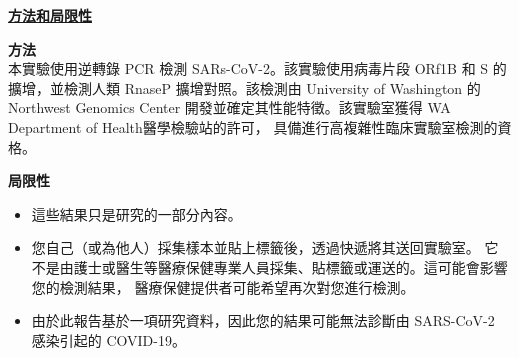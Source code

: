 \documentclass[10pt]{article}
\begin{document}
\bigskip

\large \underline{\textbf{方法和局限性}}

\textbf{方法}\\
本實驗使用逆轉錄 PCR 檢測 SARs-CoV-2。該實驗使用病毒片段 ORf1B 和 S 的擴增，並檢測人類
RnaseP 擴增對照。該檢測由 University of Washington 的 Northwest Genomics Center
開發並確定其性能特徵。該實驗室獲得 WA Department of Health醫學檢驗站的許可，
具備進行高複雜性臨床實驗室檢測的資格。

\textbf{局限性}

\begin{itemize}

\item

  這些結果只是研究的一部分內容。

\item

  您自己（或為他人）採集樣本並貼上標籤後，透過快遞將其送回實驗室。
  它不是由護士或醫生等醫療保健專業人員採集、貼標籤或運送的。這可能會影響您的檢測結果，
  醫療保健提供者可能希望再次對您進行檢測。

\item

  由於此報告基於一項研究資料，因此您的結果可能無法診斷由 SARS-CoV-2 感染引起的 COVID-19。

\end{itemize}
\end{document}
